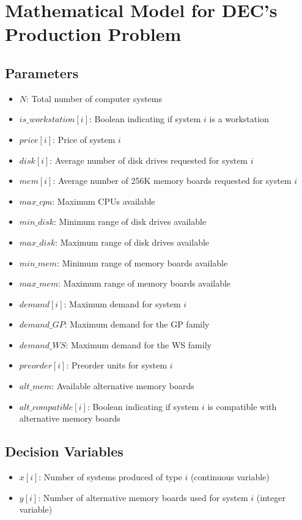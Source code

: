 \documentclass{article}
\begin{document}
\section*{Mathematical Model for DEC's Production Problem}

\subsection*{Parameters}
\begin{itemize}
    \item $N$: Total number of computer systems
    \item $is\_workstation[i]$: Boolean indicating if system $i$ is a workstation
    \item $price[i]$: Price of system $i$
    \item $disk[i]$: Average number of disk drives requested for system $i$
    \item $mem[i]$: Average number of 256K memory boards requested for system $i$
    \item $max\_cpu$: Maximum CPUs available
    \item $min\_disk$: Minimum range of disk drives available
    \item $max\_disk$: Maximum range of disk drives available
    \item $min\_mem$: Minimum range of memory boards available
    \item $max\_mem$: Maximum range of memory boards available
    \item $demand[i]$: Maximum demand for system $i$
    \item $demand\_GP$: Maximum demand for the GP family
    \item $demand\_WS$: Maximum demand for the WS family
    \item $preorder[i]$: Preorder units for system $i$
    \item $alt\_mem$: Available alternative memory boards
    \item $alt\_compatible[i]$: Boolean indicating if system $i$ is compatible with alternative memory boards
\end{itemize}

\subsection*{Decision Variables}
\begin{itemize}
    \item $x[i]$: Number of systems produced of type $i$ (continuous variable)
    \item $y[i]$: Number of alternative memory boards used for system $i$ (integer variable)
\end{itemize}
\end{document}
